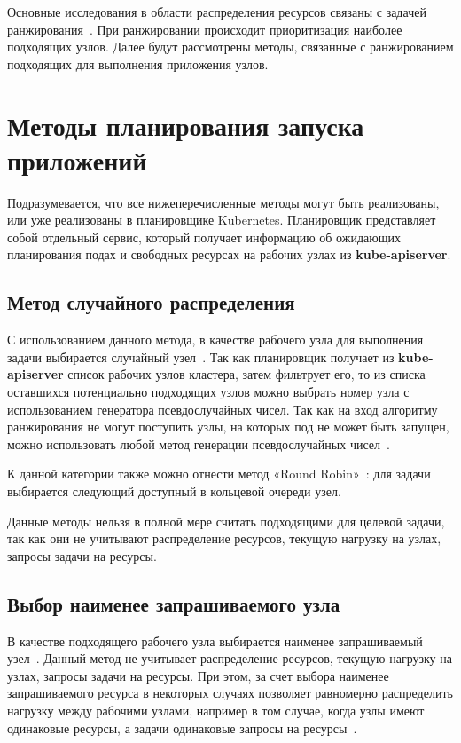 Основные исследования в области распределения ресурсов связаны с задачей ранжирования~\cite{senjab2023survey}. При ранжировании происходит приоритизация наиболее подходящих узлов. Далее будут рассмотрены методы, связанные с ранжированием подходящих для выполнения приложения узлов.

\section{Методы планирования запуска приложений}

Подразумевается, что все нижеперечисленные методы могут быть реализованы, или уже реализованы в планировщике Kubernetes. Планировщик представляет собой отдельный сервис, который получает информацию об ожидающих планирования подах и свободных ресурсах на рабочих узлах из \textbf{kube-apiserver}.

\subsection{Метод случайного распределения}

С использованием данного метода, в качестве рабочего узла для выполнения задачи выбирается случайный узел~\cite{psychas2018randomized}. Так как планировщик получает из \textbf{kube-apiserver} список рабочих узлов кластера, затем фильтрует его, то из списка оставшихся потенциально подходящих узлов можно выбрать номер узла с использованием генератора псевдослучайных чисел. Так как на вход алгоритму ранжирования не могут поступить узлы, на которых под не может быть запущен, можно использовать любой метод генерации псевдослучайных чисел~\cite{wen2023k8ssim}.

К данной категории также можно отнести метод «Round Robin»~\cite{singh2010optimized}: для задачи выбирается следующий доступный в кольцевой очереди узел. 

Данные методы нельзя в полной мере считать подходящими для целевой задачи, так как они не учитывают распределение ресурсов, текущую нагрузку на узлах, запросы задачи на ресурсы. 

\subsection{Выбор наименее запрашиваемого узла}


В качестве подходящего рабочего узла выбирается наименее запрашиваемый узел~\cite{liu2010performance}\cite{wen2023k8ssim}. Данный метод не учитывает распределение ресурсов, текущую нагрузку на узлах, запросы задачи на ресурсы. При этом, за счет выбора наименее запрашиваемого ресурса в некоторых случаях позволяет равномерно распределить нагрузку между рабочими узлами, например в том случае, когда узлы имеют одинаковые ресурсы, а задачи одинаковые запросы на ресурсы~\cite{beltre2019kubesphere}.

